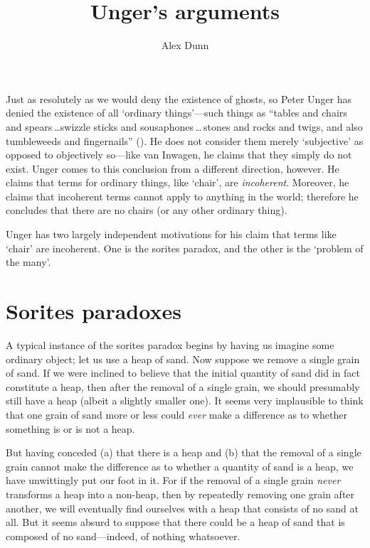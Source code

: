 \documentclass[11pt]{article}
\title{Unger's arguments}
\author{Alex Dunn}
\begin{document}
\ifstandalone
\maketitle
\begin{spacing}{1.5}
\fi

\label{unger}
Just as resolutely as we would deny the existence of ghosts, so Peter
Unger has denied the existence of all `ordinary things'---such things
as ``tables and chairs and spears\,\ldots swizzle sticks and
sousaphones\,\ldots\,stones and rocks and twigs, and also tumbleweeds
and fingernails'' (\citeyear[117]{unger1979}).  He does not consider
them merely `subjective' as opposed to objectively so---like van
Inwagen, he claims that they simply do not exist.  Unger comes to this
conclusion from a different direction, however.  He claims that terms
for ordinary things, like `chair', are {\em incoherent}.  Moreover, he
claims that incoherent terms cannot apply to anything in the world;
therefore he concludes that there are no chairs (or any other ordinary
thing).

Unger has two largely independent motivations for his claim that terms
like `chair' are incoherent.  One is the sorites paradox, and the
other is the `problem of the many'.

\section{Sorites paradoxes}
\label{sorites}
A typical instance of the sorites paradox begins by having us imagine
some ordinary object; let us use a heap of sand.  Now suppose we
remove a single grain of sand.  If we were inclined to believe that
the initial quantity of sand did in fact constitute a heap, then after
the removal of a single grain, we should presumably still have a heap
(albeit a slightly smaller one).  It seems very implausible to think
that one grain of sand more or less could {\em ever} make a difference
as to whether something is or is not a heap.

But having conceded (a) that there is a heap and (b) that the removal
of a single grain cannot make the difference as to whether a quantity
of sand is a heap, we have unwittingly put our foot in it.  For if the
removal of a single grain {\em never} transforms a heap into a
non-heap, then by repeatedly removing one grain after another, we will
eventually find ourselves with a heap that consists of no sand at
all.  But it seems absurd to suppose that there could be a heap of
sand that is composed of no sand---indeed, of nothing whatsoever.


\end{spacing}
\end{document}
